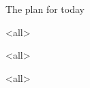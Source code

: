 \textbf{}
\begin{paracol}{2}

\begin{rightcolumn}

\begin{frame}
\titlepage
\end{frame}

\begin{frame}{The plan for today}
\tableofcontents
\end{frame}

%


%


\mode<all>

\mode*

\newpage

\mode<all>

\mode*

\clearpage


\mode*

\clearpage

\mode<all>

\mode*


\end{rightcolumn}
\end{paracol}



